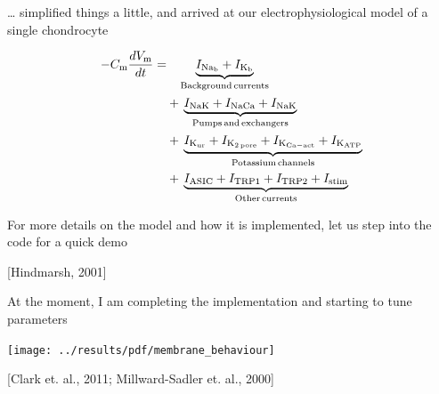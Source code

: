 \documentclass[ignorenonframetext]{beamer}
\newcommand{\references}[1] {
  \begin{flushright}
    \scriptsize [#1] \normalsize
  \end{flushright}
}
\begin{document}
\begin{frame}{\ldots{} simplified things a little, and arrived at our
    electrophysiological model of a single chondrocyte}

  \begin{equation*}
    \begin{split}
      -C_{\rm m} \frac{dV_{\rm m}}{dt} = & \phantom{+\,} \underbrace{I_{\rm Na_b} + I_{\rm K_b}}_{\rm Background\, currents}\\
      & +\, \underbrace{I_{\rm NaK} + I_{\rm NaCa} + I_{\rm NaK}}_{\rm Pumps\, and\, exchangers}\\
      & +\, \underbrace{I_{\rm K_{ur}} + I_{\rm K_{2\, pore}} + I_{\rm K_{Ca-act}} + I_{\rm K_{ATP}}}_{\rm Potassium\, channels}\\
      & +\, \underbrace{I_{\rm ASIC} + I_{\rm TRP1} + I_{\rm TRP2} + I_{\rm stim}}_{\rm Other\, currents}
    \end{split}
  \end{equation*}

  \vspace{0.5cm}
  \pause
  For more details on the model and how it is implemented, let us step
  into the code for a quick demo

  \references{Hindmarsh, 2001}

\end{frame}



%

\begin{frame}{At the moment, I am completing the implementation and
    starting to tune parameters}

  \vspace{-0.4cm}

  \begin{center}
    \texttt{[image: ../results/pdf/membrane\_behaviour]}
  \end{center}

  \references{Clark et. al., 2011; Millward-Sadler et. al., 2000}

\end{frame}
\end{document}
